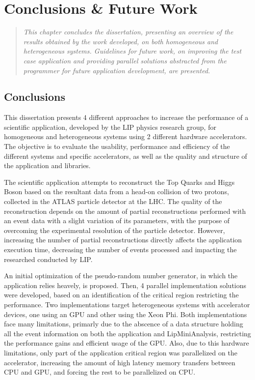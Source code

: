 \chapter{Conclusions \& Future Work}
\label{ConclusionFutureWork}

\begin{quote}
\textit{This chapter concludes the dissertation, presenting an overview of the results obtained by the work developed, on both homogeneous and heterogeneous systems. Guidelines for future work, on improving the test case application and providing parallel solutions abstracted from the programmer for future application development, are presented.}
\end{quote}

\section{Conclusions}
\label{Conclusion}

This dissertation presents 4 different approaches to increase the performance of a scientific application, developed by the LIP physics research group, for homogeneous and heterogeneous systems using 2 different hardware accelerators. The objective is to evaluate the usability, performance and efficiency of the different systems and specific accelerators, as well as the quality and structure of the application and libraries.

The scientific application attempts to reconstruct the Top Quarks and Higgs Boson based on the resultant data from a head-on collision of two protons, collected in the ATLAS particle detector at the LHC. The quality of the reconstruction depends on the amount of partial reconstructions performed with an event data with a slight variation of its parameters, with the purpose of overcoming the experimental resolution of the particle detector. However, increasing the number of partial reconstructions directly affects the application execution time, decreasing the number of events processed and impacting the researched conducted by LIP.

An initial optimization of the pseudo-random number generator, in which the application relies heavely, is proposed. Then, 4 parallel implementation solutions were developed, based on an identification of the critical region restricting the performance. Two implementations target heterogeneous systems with accelerator devices, one using an \nvidia GPU and other using the \intel Xeon Phi. Both implementations face many limitations, primarly due to the abscence of a data structure holding all the event information on both the application and LipMiniAnalysis, restricting the performance gains and efficient usage of the GPU. Also, due to this hardware limitations, only part of the application critical region was parallelized on the accelerator, increasing the amount of high latency memory transfers between CPU and GPU, and forcing the rest to be parallelized on CPU.

